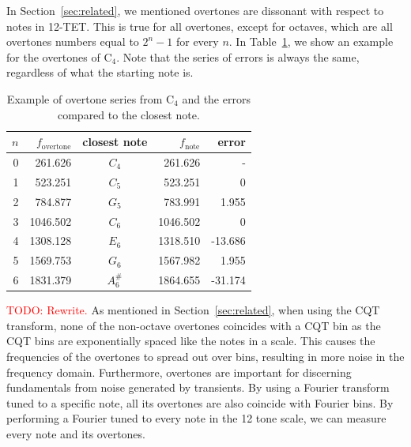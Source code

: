 \documentclass[a4paper,10pt,twocolumn]{article}
\newcommand{\note}[2]{#1${}_{#2}$}
\begin{document}
In Section~\ref{sec:related}, we mentioned overtones are dissonant with respect to notes in 12-TET. This is true for all overtones, except for octaves, which are all overtones numbers equal to $2^n - 1$ for every $n$. In Table~\ref{tab:overseries}, we show an example for the overtones of \note{C}{4}. Note that the series of errors is always the same, regardless of what the starting note is. 
\begin{table}[h]
    \centering
    \begin{tabular}{rrcrr}
        $n$ & $f_{\text{overtone}}$ & closest note & $f_\text{note}$ & error \\
        \hline
        0 & 261.626  & $C_4$    & 261.626  &  - \\
        1 & 523.251  & $C_5$    & 523.251  &  0 \\
        2 & 784.877  & $G_5$    & 783.991  &  1.955 \\
        3 & 1046.502 & $C_6$    & 1046.502 &  0 \\
        4 & 1308.128 & $E_6$    & 1318.510 &  -13.686 \\
        5 & 1569.753 & $G_6$    & 1567.982 &  1.955 \\
        6 & 1831.379 & $A^\#_6$ & 1864.655 &  -31.174
    \end{tabular}
    \caption{Example of overtone series from \note{C}{4} and the errors compared to the closest note.}
    \label{tab:overseries}
\end{table}

\textcolor{red}{TODO: Rewrite.}
As mentioned in Section~\ref{sec:related}, when using the CQT transform, none of the non-octave overtones coincides with a CQT bin as the CQT bins are exponentially spaced like the notes in a scale. This causes the frequencies of the overtones to spread out over bins, resulting in more noise in the frequency domain. Furthermore, overtones are important for discerning fundamentals from noise generated by transients. By using a Fourier transform tuned to a specific note, all its overtones are also coincide with Fourier bins. By performing a Fourier tuned to every note in the 12 tone scale, we can measure every note and its overtones.
\end{document}
